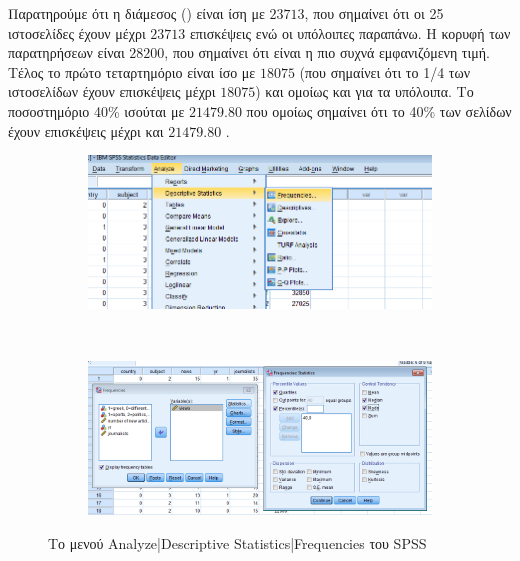 \documentclass{assignment}
\begin{document}
\begin{Assignment}[Μέρος Α]
Παρατηρούμε ότι η διάμεσος () είναι ίση με $23713$, που σημαίνει ότι οι 25 ιστοσελίδες έχουν μέχρι $23713$ επισκέψεις ενώ οι υπόλοιπες παραπάνω. Η κορυφή των παρατηρήσεων είναι $28200$, που σημαίνει ότι είναι η πιο συχνά εμφανιζόμενη τιμή. Τέλος το πρώτο τεταρτημόριο είναι ίσο με $18075$ (που σημαίνει ότι το 1/4 των ιστοσελίδων έχουν επισκέψεις μέχρι $18075$) και ομοίως και για τα υπόλοιπα. Το ποσοστημόριο 40\% ισούται με $21479.80$ που ομοίως σημαίνει ότι το 40\% των σελίδων έχουν επισκέψεις μέχρι και $21479.80$ .

\begin{figure}[htbp]
  \centering
  \begin{subfigure}[b]{0.5\textwidth}
     \includegraphics[width=\textwidth,height=0.25\textheight]{images/menu_frequencies.png}
  \end{subfigure}%
   ~ %
  \begin{subfigure}[b]{0.5\textwidth}
    \includegraphics[width=\textwidth,height=0.25\textheight]{images/frequencies.png}
  \end{subfigure}
  \caption{Το μενού Analyze|Descriptive Statistics|Frequencies του SPSS}
\label{fig:frequencies}
\end{figure}

\AssignmentTitle{%

}
\end{Assignment}
\end{document}
